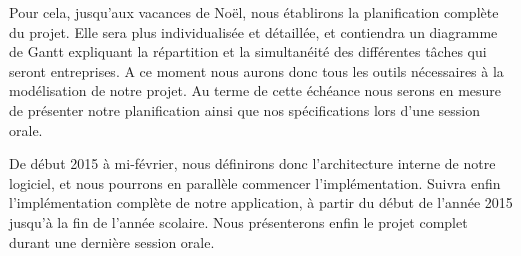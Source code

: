 		Pour cela, jusqu'aux vacances de Noël, nous établirons la planification complète du projet. Elle sera plus individualisée et détaillée, et contiendra un diagramme de Gantt expliquant la répartition et la simultanéité des différentes tâches qui seront entreprises.
		A ce moment nous aurons donc tous les outils nécessaires à la modélisation de notre projet.
		Au terme de cette échéance nous serons en mesure de présenter notre planification ainsi que nos spécifications lors d'une session orale.

		De début 2015 à mi-février, nous définirons donc l'architecture interne de notre logiciel, et nous pourrons en parallèle commencer l'implémentation.
		Suivra enfin l'implémentation complète de notre application, à partir du début de l'année 2015 jusqu'à la fin de l'année scolaire.
		Nous présenterons enfin le projet complet durant une dernière session orale.

	    
